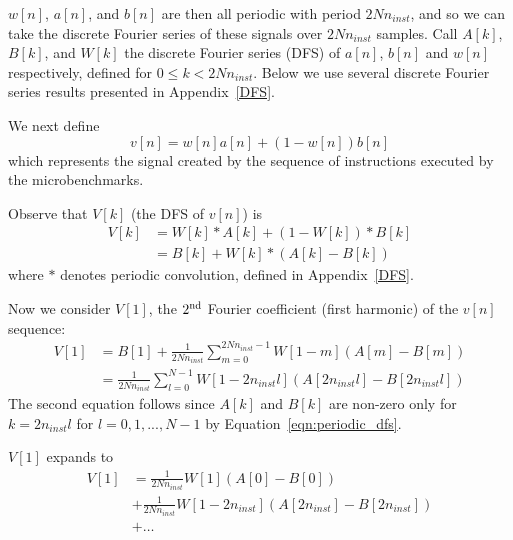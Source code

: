$w[n]$, $a[n]$, and $b[n]$ are then all periodic with period $2N n_{inst}$, and so we can take the discrete Fourier series of these signals over $2N n_{inst}$ samples. Call $A[k]$, $B[k]$, and $W[k]$ the discrete Fourier series (DFS) of $a[n]$, $b[n]$ and $w[n]$ respectively, defined for $0 \leq k < 2N n_{inst}$. Below we use several discrete Fourier series results presented in Appendix~\ref{DFS}.

We next define
\begin{equation}
  v[n]  = w[n] a[n] + (1-w[n]) b[n]
\end{equation}
which represents the signal created by the sequence of instructions executed by the microbenchmarks.

Observe that $V[k]$ (the DFS of $v[n]$) is
\begin{equation}
  \begin{aligned}
    V[k] & = W[k] \ast A[k] + (1-W[k]) \ast B[k] \\
         & = B[k] + W[k]\ast(A[k] - B[k])
  \end{aligned}
\end{equation}
where $\ast$ denotes periodic convolution, defined in Appendix~\ref{DFS}.

Now we consider $V[1]$, the $2^{\rm nd}$ Fourier coefficient (first harmonic) of the $v[n]$ sequence:
{
\small
\begin{equation}
  \label{eqn:V1}
  \begin{aligned}
      V[1] & = B[1] + \frac{1}{2N n_{inst}} \sum_{m=0}^{2N n_{inst}-1} W[1-m] (A[m] - B[m]) \\
      & = \frac{1}{2N n_{inst}} \sum_{l=0}^{N-1} W[1-2n_{inst}l] (A[2n_{inst}l] - B[2n_{inst}l])
  \end{aligned}
\end{equation}
}
The second equation follows since $A[k]$ and $B[k]$ are non-zero only for $k = 2n_{inst} l$ for \hbox{$l=0,1,...,N-1$} by Equation~\ref{eqn:periodic_dfs}.

\vskip 0.1in
$V[1]$ expands to
\begin{equation}
  \label{eqn:v_eq_rab}
  \begin{aligned}
    V[1] & = \frac{1}{2N n_{inst}} W[1] (A[0] - B[0]) \\
    & + \frac{1}{2N n_{inst}} W[1-2n_{inst}] (A[2n_{inst}] - B[2n_{inst}])  \\
    & + \ldots
  \end{aligned}
\end{equation}


